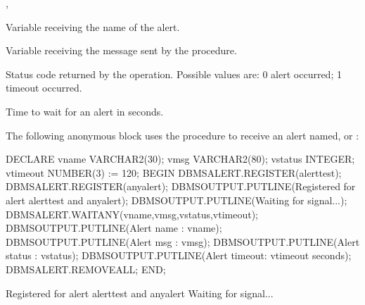 \documentclass[letterpaper,10pt,english,openany,oneside]{sphinxmanual}
\begin{document}
,
\begin{quote}

\end{quote}



Variable receiving the name of the alert.


Variable receiving the message sent by the  procedure.


Status code returned by the operation. Possible values are: 0 \textendash{} alert occurred; 1 \textendash{} timeout occurred.


Time to wait for an alert in seconds.


The following anonymous block uses the  procedure to receive an alert named,  or :

%
\begin{sphinxVerbatim}[commandchars=\\\{\}]
DECLARE
    v\PYGZus{}name           VARCHAR2(30);
    v\PYGZus{}msg            VARCHAR2(80);
    v\PYGZus{}status         INTEGER;
    v\PYGZus{}timeout        NUMBER(3) := 120;
BEGIN
   DBMS\PYGZus{}ALERT.REGISTER(\PYGZsq{}alert\PYGZus{}test\PYGZsq{});
   DBMS\PYGZus{}ALERT.REGISTER(\PYGZsq{}any\PYGZus{}alert\PYGZsq{});
   DBMS\PYGZus{}OUTPUT.PUT\PYGZus{}LINE(\PYGZsq{}Registered for alert alert\PYGZus{}test and any\PYGZus{}alert\PYGZsq{});
   DBMS\PYGZus{}OUTPUT.PUT\PYGZus{}LINE(\PYGZsq{}Waiting for signal...\PYGZsq{});
   DBMS\PYGZus{}ALERT.WAITANY(v\PYGZus{}name,v\PYGZus{}msg,v\PYGZus{}status,v\PYGZus{}timeout);
   DBMS\PYGZus{}OUTPUT.PUT\PYGZus{}LINE(\PYGZsq{}Alert name   : \PYGZsq{} \textbar{}\textbar{} v\PYGZus{}name);
   DBMS\PYGZus{}OUTPUT.PUT\PYGZus{}LINE(\PYGZsq{}Alert msg    : \PYGZsq{} \textbar{}\textbar{} v\PYGZus{}msg);
   DBMS\PYGZus{}OUTPUT.PUT\PYGZus{}LINE(\PYGZsq{}Alert status : \PYGZsq{} \textbar{}\textbar{} v\PYGZus{}status);
   DBMS\PYGZus{}OUTPUT.PUT\PYGZus{}LINE(\PYGZsq{}Alert timeout: \PYGZsq{} \textbar{}\textbar{} v\PYGZus{}timeout \textbar{}\textbar{} \PYGZsq{} seconds\PYGZsq{});
   DBMS\PYGZus{}ALERT.REMOVEALL;
END;

Registered for alert alert\PYGZus{}test and any\PYGZus{}alert
Waiting for signal...
\end{sphinxVerbatim}
\end{document}
